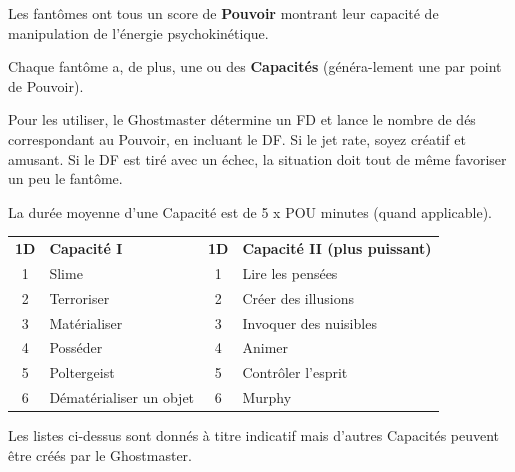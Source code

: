 \begin{frame}[b]
{\begin{minipage}[c][0.95\textheight][c]{\linewidth}
\myindent Les fantômes ont tous un score de \textbf{Pouvoir} montrant leur capacité de manipulation de l'énergie psychokinétique.

\myindent Chaque fantôme a, de plus, une ou des \textbf{Capacités} (généra-lement une par point de Pouvoir).

\myindent Pour les utiliser, le Ghostmaster détermine un FD et lance le nombre de dés correspondant au Pouvoir, en incluant le DF. Si le jet rate, soyez créatif et amusant. Si le DF est tiré avec un échec, la situation doit tout de même favoriser un peu le fantôme.

\myindent La durée moyenne d'une Capacité est de 5 x POU minutes (quand applicable).

\begin{center}
\begin{tabular}{clcl}
\textbf{1D} & \textbf{Capacité I} & \textbf{1D} & \textbf{Capacité II (plus puissant)} \\
1 & Slime & 1 & Lire les pensées \\
2 & Terroriser & 2 & Créer des illusions \\
3 & Matérialiser & 3 & Invoquer des nuisibles \\
4 & Posséder & 4 & Animer \\
5 & Poltergeist & 5 & Contrôler l'esprit \\
6 & Dématérialiser un objet & 6 & Murphy \\
\end{tabular}
\end{center}

\myindent Les listes ci-dessus sont donnés à titre indicatif mais d'autres Capacités peuvent être créés par le Ghostmaster.


\end{minipage}}
\end{frame}

